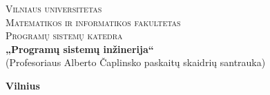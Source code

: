 \begin{titlepage}

  \begin{center}

    \textsc{\Large Vilniaus universitetas\\
    Matematikos ir informatikos fakultetas\\
    Programų sistemų katedra}\\[6.0cm]

    \textbf{ \LARGE „Programų sistemų inžinerija“ }\\
    { \Large (Profesoriaus Alberto Čaplinsko paskaitų skaidrių 
    santrauka)}\\[0.5cm]

    \vfill

    \textbf{\large  Vilnius \\ \the\year }
  \end{center}
  
\end{titlepage}
